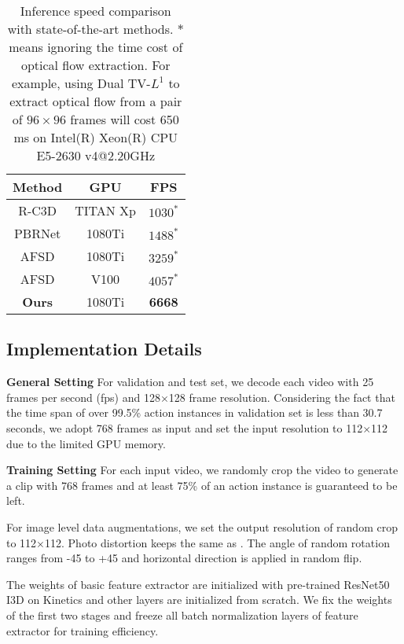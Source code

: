 \documentclass[final]{cvpr}
\begin{document}
\begin{table}[htbp]
    \caption{Inference speed comparison with state-of-the-art methods. $\ast$ means ignoring the time cost of optical flow extraction. For example, using Dual TV-$L^{1}$ \cite{zach2007duality} to extract optical flow from a pair of $96\times96$ frames will cost 650 ms on Intel(R) Xeon(R) CPU E5-2630 v4@2.20GHz}
    \centering
    \begin{tabular}{ c | c | c }
        \toprule
        Method & GPU & FPS \\
        \midrule
        R-C3D \cite{xu2017r} & TITAN Xp & $1030^{\ast }$ \\
        PBRNet \cite{liu2020progressive} & 1080Ti & $1488^{\ast }$ \\
        AFSD \cite{lin2021learning} & 1080Ti & $3259^{\ast }$ \\
        AFSD \cite{lin2021learning} & V100 & $4057^{\ast }$ \\
        \midrule
        \textbf{Ours} & 1080Ti & \textbf{6668} \\
        \bottomrule
    \end{tabular}
    \label{tab:fps}
\end{table}

\subsection{Implementation Details}
\textbf{General Setting}
For validation and test set, we decode each video with 25 frames per second (fps) and 128$\times$128 frame resolution. Considering the fact that the time span of over 99.5\% action instances in validation set is less than 30.7 seconds, we adopt 768 frames as input and set the input resolution to 112$\times$112 due to the limited GPU memory.

\textbf{Training Setting}
For each input video, we randomly crop the video to generate a clip with 768 frames and at least 75\% of an action instance is guaranteed to be left. 

For image level data augmentations, we set the output resolution of random crop to 112$\times$112. Photo distortion keeps the same as \cite{liu2016ssd}. The angle of random rotation ranges from -45 to +45 and horizontal direction is applied in random flip.

The weights of basic feature extractor are initialized with pre-trained ResNet50 I3D on Kinetics \cite{kay2017kinetics} and other layers are initialized from scratch. We fix the weights of the first two stages and freeze all batch normalization layers of feature extractor for training efficiency. 
\end{document}
